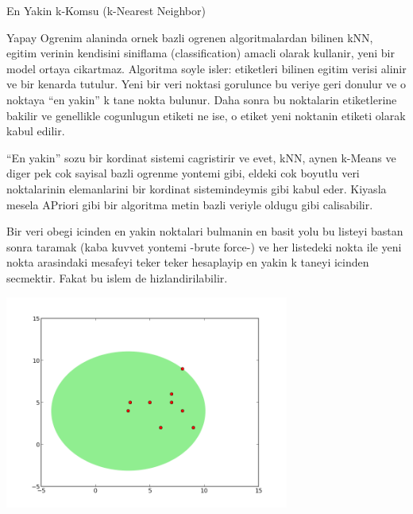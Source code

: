 \documentclass[12pt,fleqn]{article}\usepackage{../common}
\begin{document}
En Yakin k-Komsu (k-Nearest Neighbor)

Yapay Ogrenim alaninda ornek bazli ogrenen algoritmalardan bilinen kNN,
egitim verinin kendisini siniflama (classification) amacli olarak kullanir,
yeni bir model ortaya cikartmaz. Algoritma soyle isler: etiketleri bilinen
egitim verisi alinir ve bir kenarda tutulur. Yeni bir veri noktasi
gorulunce bu veriye geri donulur ve o noktaya ``en yakin'' k tane nokta
bulunur. Daha sonra bu noktalarin etiketlerine bakilir ve genellikle
cogunlugun etiketi ne ise, o etiket yeni noktanin etiketi olarak kabul
edilir.

``En yakin'' sozu bir kordinat sistemi cagristirir ve evet, kNN, aynen
k-Means ve diger pek cok sayisal bazli ogrenme yontemi gibi, eldeki cok
boyutlu veri noktalarinin elemanlarini bir kordinat sistemindeymis gibi
kabul eder. Kiyasla mesela APriori gibi bir algoritma metin bazli veriyle
oldugu gibi calisabilir. 

Bir veri obegi icinden en yakin noktalari bulmanin en basit yolu bu listeyi
bastan sonra taramak (kaba kuvvet yontemi -brute force-) ve her listedeki
nokta ile yeni nokta arasindaki mesafeyi teker teker hesaplayip en yakin k
taneyi icinden secmektir. Fakat bu islem de hizlandirilabilir. 

\includegraphics[height=7cm]{knn1.png}
\end{document}
